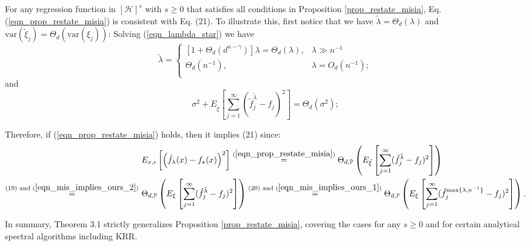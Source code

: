 \documentclass{article}
\theoremstyle{plain}
\theoremstyle{definition}
\theoremstyle{remark}
\newcommand{\calH}{\mathcal{H}}
\begin{document}
\begin{appendix}
For any regression function in $[\calH]^{s}$ with $s \geq 0$ that satisfies all conditions in Proposition \ref{prop_restate_misia}, Eq. (\ref{eqn_prop_restate_misia}) is consistent with Eq. (21). To illustrate this, first notice that we have $\tilde{\lambda} = \Theta_d(\lambda)$ and $\mathrm{var}(\tilde{\xi}_j) = \Theta_d(\mathrm{var}(\xi_j))$: Solving (\ref{eqn_lambda_star}) we have
    \begin{equation}\label{eqn_mis_implies_ours_1}
        \tilde{\lambda} = 
        \left\{\begin{matrix}
\left[1+\Theta_d(d^{u-\gamma})\right]\lambda = \Theta_d(\lambda), &  \lambda \gg n^{-1}\\
\Theta_d(n^{-1}), & \lambda = O_d(n^{-1}); \\
\end{matrix}\right.
    \end{equation}
and
    \begin{equation}\label{eqn_mis_implies_ours_2}
    \sigma^2 + E_{\tilde{\xi}}\left[\sum_{j=1}^{\infty}(\tilde{f}_j^{\tilde{\lambda}} - f_j)^2\right] = \Theta_d(\sigma^2);
    \end{equation}

Therefore, if (\ref{eqn_prop_restate_misia}) holds, then it implies (21) since:
    \begin{equation*}
        \begin{aligned}
           &~ E_{x, \epsilon} \left[ \left(\hat{f}_{\lambda}(x) - f_{\star}(x) \right)^{2} \right] \overset{(\ref{eqn_prop_restate_misia})}{=}
   \Theta_{d, \mathbb{P}} \left( E_{\tilde{\xi}}\left[\sum_{j=1}^{\infty}(\tilde{f}_j^{\tilde{\lambda}} - f_j)^2\right] \right)\\
   \overset{(19) \text{ and } (\ref{eqn_mis_implies_ours_2})}{=} &~
   \Theta_{d, \mathbb{P}} \left(E_{\xi}\left[\sum_{j=1}^{\infty}(\hat{f}_j^{\tilde{\lambda}} - f_j)^2\right]\right)
   \overset{(20) \text{ and } (\ref{eqn_mis_implies_ours_1})}{=} 
   \Theta_{d, \mathbb{P}} \left(
E_{\xi}\left[\sum_{j=1}^{\infty}(\hat{f}_j^{\max\{\lambda, n^{-1}\}} - f_j)^2\right]
\right).
        \end{aligned}
    \end{equation*}





In summary, Theorem 3.1 strictly generalizes Proposition \ref{prop_restate_misia},
covering the cases for any $s \geq 0$ and for certain analytical spectral algorithms including KRR.





\end{appendix}
\end{document}
